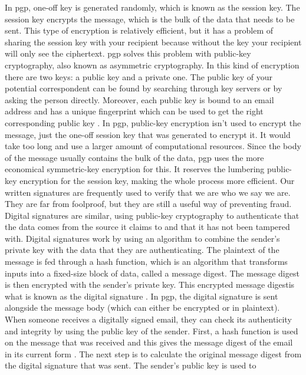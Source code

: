 In \acrshort{pgp}, one-off key is generated randomly, which is known as the session key. The session key encrypts the message, which is the bulk of the data that needs to be sent. This type of encryption is relatively efficient, but it has a problem of sharing the session key with your recipient because without the key your recipient will only see the ciphertext. \acrshort{pgp} solves this problem with public-key cryptography, also known as asymmetric cryptography. In this kind of encryption there are two keys: a public key and a private one. The public key of your potential correspondent can be found by searching through key servers or by asking the person directly. Moreover, each public key is bound to an \acrshort{email} address and has a unique fingerprint which can be used to get the right corresponding public key \cite{pgpWiki}. In \acrshort{pgp}, public-key encryption isn't used to encrypt the message, just the one-off session key that was generated to encrypt it. It would take too long and use a larger amount of computational resources. Since the body of the message usually contains the bulk of the data, \acrshort{pgp} uses the more economical symmetric-key encryption for this. It reserves the lumbering public-key encryption for the session key, making the whole process more efficient. Our written signatures are frequently used to verify that we are who we say we are. They are far from foolproof, but they are still a useful way of preventing fraud.
\newline
Digital signatures are similar, using public-key cryptography to authenticate that the data comes from the source it claims to and that it has not been tampered with. Digital signatures work by using an algorithm to combine the sender's private key with the data that they are authenticating. The plaintext of the message is fed through a hash function, which is an algorithm that transforms inputs into a fixed-size block of data, called a message digest. The message digest is then encrypted with the sender's private key. This encrypted message digestis what is known as the digital signature \cite{pgpTech}. In \acrshort{pgp}, the digital signature is sent alongside the message body (which can either be encrypted or in plaintext). When someone receives a digitally signed \acrfull{email}, they can check its authenticity and integrity by using the public key of the sender. First, a hash function is used on the message that was received and this gives the message digest of the email in its current form \cite{pgpTech}. The next step is to calculate the original message digest from the digital signature that was sent. The sender's public key is used to
